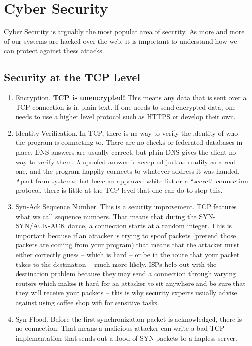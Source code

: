 \section{Cyber Security}

Cyber Security is arguably the most popular area of security.
As more and more of our systems are hacked over the web, it is important to understand how we can protect against these attacks.

\subsection{Security at the TCP Level}

\begin{enumerate}
\item Encryption.
  \textbf{TCP is unencrypted!} This means any data that is sent over a TCP connection is in plain text.
  If one needs to send encrypted data, one needs to use a higher level protocol such as HTTPS or develop their own.
\item Identity Verification.
  In TCP, there is no way to verify the identity of who the program is connecting to.
  There are no checks or federated databases in place.
  DNS answers are usually correct, but plain DNS gives the client no way to verify them.
  A spoofed answer is accepted just as readily as a real one, and the program happily connects to whatever address it was handed.
  Apart from systems that have an approved white list or a ``secret'' connection protocol, there is little at the TCP level that one can do to stop this.
\item Syn-Ack Sequence Number.
  This is a security improvement.
  TCP features what we call sequence numbers.
  That means that during the SYN-SYN/ACK-ACK dance, a connection starts at a random integer.
  This is important because if an attacker is trying to spoof packets (pretend those packets are coming from your program) that means that the attacker must either correctly guess -- which is hard -- or be in the route that your packet takes to the destination -- much more likely.
  ISPs help out with the destination problem because they may send a connection through varying routers which makes it hard for an attacker to sit anywhere and be sure that they will receive your packets -- this is why security experts usually advise against using coffee shop wifi for sensitive tasks.
\item Syn-Flood.
  Before the first synchronization packet is acknowledged, there is no connection.
  That means a malicious attacker can write a bad TCP implementation that sends out a flood of SYN packets to a hapless server.

\end{enumerate}

